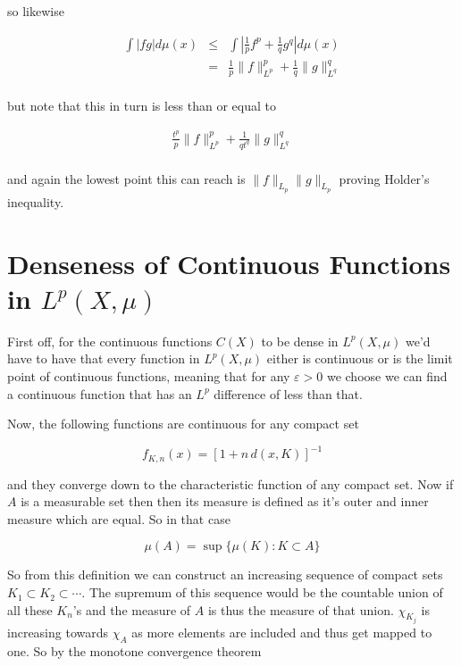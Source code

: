 \documentclass[oneside]{book}
\begin{document}
so likewise

\begin{eqnarray}
\int |fg| d\mu(x) &\le& \int |\frac{1}{p} f^p + \frac{1}{q} g^q| d\mu(x) \nonumber\\
&=& \frac{1}{p}\|f\|_{L^p}^p + \frac{1}{q} \| g \|_{L^q}^q \nonumber\\
\end{eqnarray}

but note that this in turn is less than or equal to 

\begin{eqnarray}
\frac{t^p}{p}\|f\|_{L^p}^p + \frac{1}{qt^q} \| g \|_{L^q}^q \nonumber\\
\end{eqnarray}

and again the lowest point this can reach is $\|f\|_{L_p} \| g\|_{L_p}$ proving Holder's inequality. 

\section{Denseness of Continuous Functions in $L^p(X,\mu)$}
First off, for the continuous functions $C(X)$ to be dense in $L^p(X,\mu)$ we'd have to have that every function in $L^p(X,\mu)$ either is continuous or is the limit point of continuous functions, meaning that for any $\varepsilon >0$ we choose we can find a continuous function that has an $L^p$ difference of less than that. 

Now, the following functions are continuous for any compact set 

\begin{equation}
f_{K,n}(x) = [1+n\,d(x,K)]^{-1}
\end{equation}

and they converge down to the characteristic function of any compact set. Now if $A$ is a measurable set then then its measure is defined as it's outer and inner measure which are equal. So in that case

\begin{equation}
\mu(A) = \sup\{\mu(K): K \subset A \}
\end{equation}

So from this definition we can construct an increasing sequence of compact sets $K_1 \subset K_2 \subset \cdots$. The supremum of this sequence would be the countable union of all these $K_n$'s and the measure of $A$ is thus the measure of that union. $\chi_{K_j}$ is increasing towards $\chi_A$ as more elements are included and thus get mapped to one. So by the monotone convergence theorem
\end{document}
